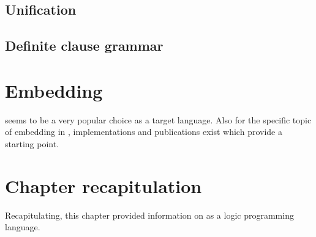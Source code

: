\documentclass[thesis-solanki.tex]{subfiles}
\begin{document}
\subsection{Unification}



\subsection{Definite clause grammar}



\section{Embedding }

\begin{comment}
Existing implementations

As a starting point a few publications and implementations helped in exploring the topic. The shortcomings were clearly visible to work and
improve upon giving a starting point.
\end{comment}

 seems to be a very popular choice as a target language. Also for the specific topic of embedding  in 
, implementations and publications exist which provide a starting point.


\section{Chapter recapitulation}
Recapitulating, this chapter provided information on  as a logic programming language.

\ifMain
\begin{scope}
  \nolinenumbers
  \enotesize
  \par
  \begin{singlespace}
  \setlength{\parskip}{12pt plus 2pt minus 1pt}
  \theendnotes
  \par
  \end{singlespace}
\end{scope}
\fi
\end{document}
